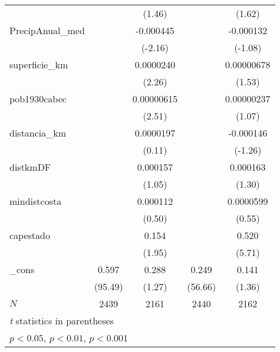 {\begin{tabular}{l*{4}{c}}
            &                     &      (1.46)         &                     &      (1.62)         \\
[1em]
PrecipAnual\_med&                     &   -0.000445\sym{*}  &                     &   -0.000132         \\
            &                     &     (-2.16)         &                     &     (-1.08)         \\
[1em]
superficie\_km&                     &   0.0000240\sym{*}  &                     &  0.00000678         \\
            &                     &      (2.26)         &                     &      (1.53)         \\
[1em]
pob1930cabec&                     &  0.00000615\sym{*}  &                     &  0.00000237         \\
            &                     &      (2.51)         &                     &      (1.07)         \\
[1em]
distancia\_km&                     &   0.0000197         &                     &   -0.000146         \\
            &                     &      (0.11)         &                     &     (-1.26)         \\
[1em]
distkmDF    &                     &    0.000157         &                     &    0.000163         \\
            &                     &      (1.05)         &                     &      (1.30)         \\
[1em]
mindistcosta&                     &    0.000112         &                     &   0.0000599         \\
            &                     &      (0.50)         &                     &      (0.55)         \\
[1em]
capestado   &                     &       0.154         &                     &       0.520\sym{***}\\
            &                     &      (1.95)         &                     &      (5.71)         \\
[1em]
\_cons      &       0.597\sym{***}&       0.288         &       0.249\sym{***}&       0.141         \\
            &     (95.49)         &      (1.27)         &     (56.66)         &      (1.36)         \\
\hline
\(N\)       &        2439         &        2161         &        2440         &        2162         \\
\hline\hline
\multicolumn{5}{l}{\footnotesize \textit{t} statistics in parentheses}\\
\multicolumn{5}{l}{\footnotesize \sym{*} \(p<0.05\), \sym{**} \(p<0.01\), \sym{***} \(p<0.001\)}\\
\end{tabular}
}

